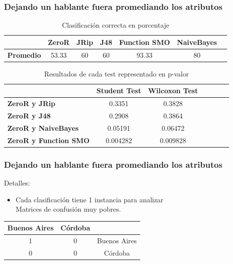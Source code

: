 \documentclass[mathserif]{beamer}%
\begin{document}
\begin{frame}
	\frametitle{Dejando un hablante fuera promediando los atributos}
	\begin{table}[H]
		\centering
		\begin{tabular}{|l|c|c|c|c|c|c|}
			\hline
			\textbf{}  & \textbf{ZeroR} & \textbf{JRip} & \textbf{J48} & \textbf{Function SMO} & \textbf{NaiveBayes} \\ \hline
			\textbf{Promedio} & 53.33 & 60 & 60 & 93.33 & 80  \\ \hline
		\end{tabular}
		\caption{Clasificación correcta en porcentaje}
		\label{class_corr_en_pct}
	\end{table}
	

\begin{table}[H]
	\centering
	\begin{tabular}{|l|c|c|c|c|c|c|}
		\hline
		\textbf{}  & \textbf{Student Test} & \textbf{Wilcoxon Test} \\ \hline
		\textbf{ZeroR y JRip}  & 0.3351 & 0.3828 \\ \hline
		\textbf{ZeroR y J48}  & 0.2908 &  0.3864 \\ \hline
		\textbf{ZeroR y NaiveBayes}  & 0.05191 & 0.06472 \\ \hline
		\textbf{ZeroR y Function SMO}  &  0.004282 & 0.009828 \\ \hline
	\end{tabular}
	\caption{Resultados de cada test representado en p-valor}
	\label{res_tests_wilcoxon_student}
\end{table}
	
\end{frame}

\begin{frame}
	\frametitle{Dejando un hablante fuera promediando los atributos}
	
	Detalles:
	
	\begin{itemize}
		\item Cada clasificación tiene 1 instancia para analizar \\
		Matrices de confusión muy pobres.
	\end{itemize}
	
	\begin{table}[H]
		\centering
		\begin{tabular}{|c|c|c|}
		\hline
		Buenos Aires & Córdoba & \\ \hline
		1 & 0 & Buenos Aires\\ \hline
		0 & 0 & Córdoba\\ \hline
		\end{tabular}
	\end{table}
\end{frame}
\end{document}
